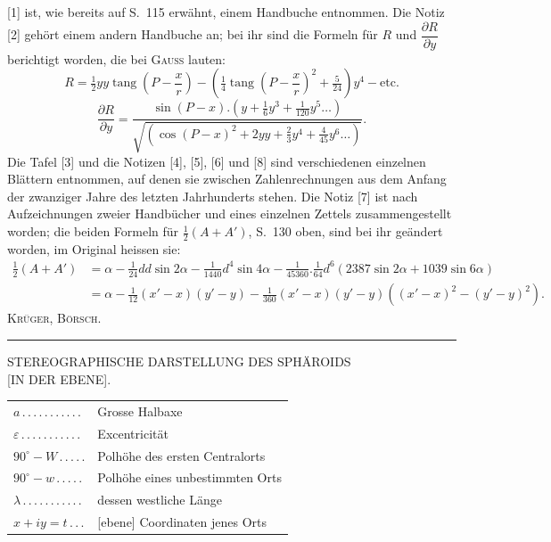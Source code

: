 \begingroup\footnotesize
[1] ist, wie bereits auf S.~115 erwähnt, einem Handbuche entnommen. Die Notiz [2] gehört einem andern Handbuche an; bei ihr sind die Formeln für $R$ und $\dfrac{\partial R}{\partial y}$ berichtigt worden, die bei \textsc{Gauss} lauten:
\[
R=\tfrac12yy\operatorname{tang}\left(P-\frac xr\right)-\left(\tfrac14\operatorname{tang}\left(P-\frac xr\right)^2+\tfrac5{24}\right)y^4-\text{etc.}
\]
\[
\frac{\partial R}{\partial y}=\frac{\sin(P-x).(y+\tfrac16y^3+\tfrac1{120}y^5\ldots)}{\sqrt{(\cos(P-x)^2+2yy+\tfrac23y^4+\tfrac4{45}y^6\ldots)}}.
\]
Die Tafel [3] und die Notizen [4], [5], [6] und [8] sind verschiedenen einzelnen Blättern entnommen, auf denen sie zwischen Zahlenrechnungen aus dem Anfang der zwanziger Jahre des letzten Jahrhunderts stehen. Die Notiz [7] ist nach Aufzeichnungen zweier Handbücher und eines einzelnen Zettels zusammengestellt worden; die beiden Formeln für $\tfrac12(A+A')$, S.~130 oben, sind bei ihr geändert worden, im Original heissen sie:
\[
\begin{aligned}
\tfrac12(A+A')&=\alpha-\tfrac1{24}dd\sin2\alpha-\tfrac1{1440}d^4\sin4\alpha-\tfrac1{45360}.\tfrac1{64}d^6(2387\sin2\alpha+1039\sin6\alpha)\\
&=\alpha-\tfrac1{12}(x'-x)(y'-y)-\tfrac1{360}(x'-x)(y'-y)((x'-x)^2-(y'-y)^2).
\end{aligned}
\]
\hfill\textsc{Krüger, Börsch.}\par
\begin{center}\rule{.24\textwidth}{.4pt}\end{center}
\par\endgroup\par\endgroup
\clearpage
\begin{center}
{\large STEREOGRAPHISCHE DARSTELLUNG DES SPHÄROIDS\\{}[IN DER EBENE].}
\end{center}
\vspace{12mm}
\begin{center}
\begin{tabular}{@{}l@{ }l@{}}
$a\, .\, .\, .\, .\, .\, .\, .\, .\, .\, .\, .$&Grosse Halbaxe\\[3pt]
$\varepsilon\, .\, .\, .\, .\, .\, .\, .\, .\, .\, .\, .$&Excentricität\\[3pt]
$90^\circ-W\, .\, .\, .\, .\, .$&Polhöhe des ersten Centralorts\\[3pt]
$90^\circ-w\, .\, .\, .\, .\, .$&Polhöhe eines unbestimmten Orts\\[3pt]
$\lambda\, .\, .\, .\, .\, .\, .\, .\, .\, .\, .\, .$&dessen westliche Länge\\[3pt]
$x+iy=t\, .\, .\, .$&[ebene] Coordinaten jenes Orts
\end{tabular}
\end{center}
